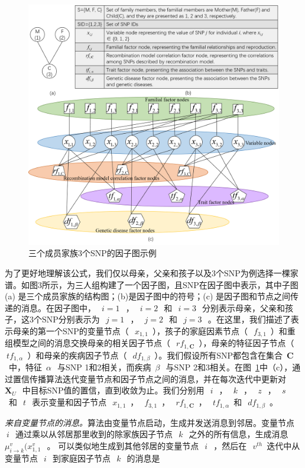 \begin{figure}[htbp]
	\centering
	\includegraphics[width=0.95\linewidth]{./figures/factor-graph.png}
	\centering
	\caption{三个成员家族3个SNP的因子图示例}\label{fig:factor-graph}
\end{figure}

为了更好地理解该公式，我们仅以母亲，父亲和孩子以及3个SNP为例选择一棵家谱。如图3所示，为三人组构建了一个因子图，且SNP在因子图中表示，其中子图 (a) 是三个成员家族的结构图；(b)是因子图中的符号；(c) 是因子图和节点之间传递的消息。在因子图中，~$~i=1~$~，~$~i=2~$~和~$~i=3~$~分别表示母亲，父亲和孩子，这3个SNP分别表示为~$~j=1~$~，~$~j=2~$~和~$~j=3~$~。在这里，我们描述了表示母亲的第一个SNP的变量节点（~$~x_{1,1}$~），孩子的家庭因素节点（~$~f_{3,1}$~）和重组模型之间的消息交换母亲的相关因子节点（~$~rf_{1,\mathbf{C}}$~），母亲的特征因子节点（~$~tf_{1,\alpha}$~）和母亲的疾病因子节点（~$~df_{1,\beta}$~）。我们假设所有SNP都包含在集合~$\mathbf{C}$~中，特征~$\alpha~$~与SNP 1和2相关，而疾病~$\beta~$~与SNP 2和3相关。在图~\ref{fig:factor-graph}中（c），通过置信传播算法迭代变量节点和因子节点之间的消息，并在每次迭代中更新对~$\mathbf{X}_U~$~中目标SNP值的置信，直到收敛为止。我们分别用~$~i~$~，~$~k~$~，~$~z~$~，~$~s~$~和~$~t~$~表示变量和因子节点~$~x_{1,1}$~，~$~f_{3,1}$~，~$~rf_{1,\mathbf{C}}$~，~$~tf_{1,\alpha}$~和~$~df_{1,\beta}$~。


\emph{来自变量节点的消息。}算法由变量节点启动，生成并发送消息到邻居。变量节点~$~i~$~通过乘以从邻居那里收到的除家族因子节点~$~k~$~之外的所有信息，生成消息~$\mu_{i \rightarrow k}^v(x_{1,1}^v~$~。 可以类似地生成到其他邻居的变量节点~$~i~$~，然后在~$~v^{th}$~迭代中从变量节点~$~i~$~到家庭因子节点~$~k~$~的消息是

